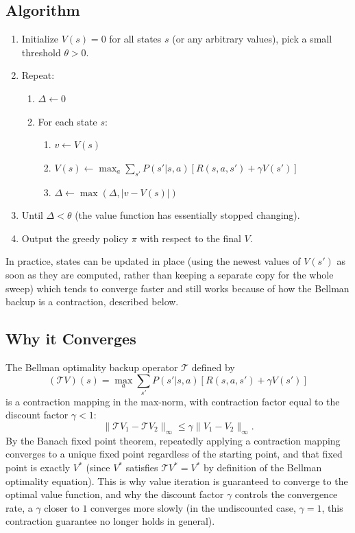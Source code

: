 \documentclass[conference]{IEEEtran}
\begin{document}
\subsection*{Algorithm}
\begin{enumerate}
    \item Initialize $V(s) = 0$ for all states $s$ (or any arbitrary values), pick a small threshold $\theta > 0$.
    \item Repeat:
    \begin{enumerate}
        \item $\Delta \leftarrow 0$
        \item For each state $s$:
        \begin{enumerate}
            \item $v \leftarrow V(s)$
            \item $V(s) \leftarrow \max_{a}\sum_{s'} P(s'|s,a)[R(s,a,s') + \gamma V(s')]$
            \item $\Delta \leftarrow \max(\Delta, |v - V(s)|)$
        \end{enumerate}
    \end{enumerate}
    \item Until $\Delta < \theta$ (the value function has essentially stopped changing).
    \item Output the greedy policy $\pi$ with respect to the final $V$.
\end{enumerate}
In practice, states can be updated in place (using the newest values of $V(s')$ as soon as they are computed, rather than keeping a separate copy for the whole sweep) which tends to converge faster and still works because of how the Bellman backup is a contraction, described below.

\subsection*{Why it Converges}
The Bellman optimality backup operator $\mathcal{T}$ defined by
\[
    (\mathcal{T}V)(s) = \max_{a}\sum_{s'} P(s'|s,a)[R(s,a,s') + \gamma V(s')]
\]
is a contraction mapping in the max-norm, with contraction factor equal to the discount factor $\gamma < 1$:
\[
    \|\mathcal{T}V_1 - \mathcal{T}V_2\|_\infty \le \gamma \|V_1 - V_2\|_\infty.
\]
By the Banach fixed point theorem, repeatedly applying a contraction mapping converges to a unique fixed point regardless of the starting point, and that fixed point is exactly $V^*$ (since $V^*$ satisfies $\mathcal{T}V^* = V^*$ by definition of the Bellman optimality equation). This is why value iteration is guaranteed to converge to the optimal value function, and why the discount factor $\gamma$ controls the convergence rate, a $\gamma$ closer to $1$ converges more slowly (in the undiscounted case, $\gamma = 1$, this contraction guarantee no longer holds in general).
\end{document}
